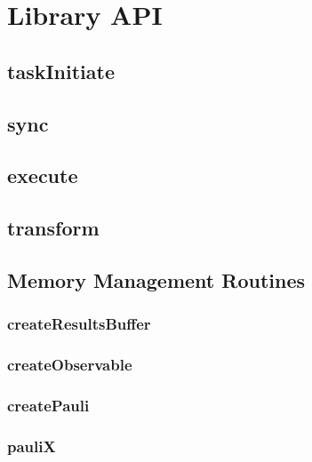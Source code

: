 \documentclass[10pt]{book}
\begin{document}
\section{\qcor Library API}\label{sec:qcor_library_api}
\subsection{\textbf{taskInitiate}}\label{subsec:taskInitiate}


\subsection{\textbf{sync}}\label{subsec:sync}


\subsection{\textbf{execute}}\label{subsec:execute}


\subsection{\textbf{transform}}\label{subsec:transform}



\subsection{Memory Management Routines}
\subsubsection{\textbf{createResultsBuffer}}\label{subsec:createresbuf}


\subsubsection{\textbf{createObservable}}\label{subsec:createobserv}


\subsubsection{\textbf{createPauli}}\label{subsec:createpauli}


\subsubsection{\textbf{pauliX}}\label{subsec:paulix}

\end{document}
